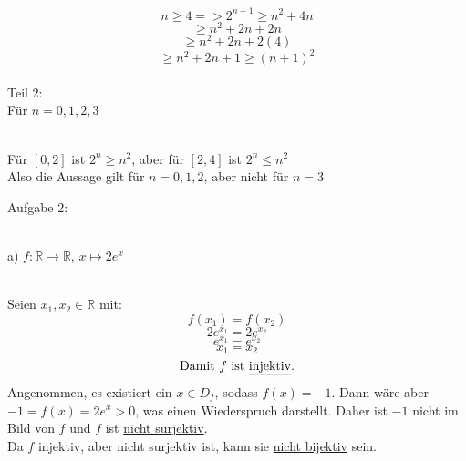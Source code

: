 \documentclass[11pt]{article}
\begin{document}
					$$n\geq4 => 2^{n+1} \geq n^2+4n$$
					$$\geq n^2 + 2n + 2n$$
					$$\geq n^2 + 2n + 2(4)$$
					$$\geq n^2 + 2n + 1 \geq (n+1)^2$$\\
				Teil 2:\\
				Für $n=0,1,2,3$	\\
				\\
			Für $[0,2]$ ist $2^n \geq n^2$, aber für $[2,4]$ ist $2^n \leq n^2$\\
			Also die Aussage gilt für $n=0,1,2$, aber nicht für $n=3$\\
		\noindent \begin{Large}Aufgabe 2:\end{Large}\\[2pt]
			\indent a) $f: \mathbb{R} \rightarrow \mathbb{R}$, $x \mapsto 2e^x$\\
			\\
			Seien $x_1, x_2 \in \mathbb{R}$ mit:
				$$f(x_1)=f(x_2)$$
				$$2e^{x_1}=2e^{x_2}$$
				$$e^{x_1}=e^{x_2}$$
				$$x_1=x_2$$
				$$\mbox{Damit }f \mbox{ ist \underline{injektiv}.}$$
				Angenommen, es existiert ein $x \in D_f$, sodass $f(x)=-1$. Dann wäre aber $-1=f(x)=2e^x>0$, was einen Wiederspruch darstellt. Daher ist $-1$ nicht im Bild von $f$ und $f$ ist \underline{nicht surjektiv}.\\
				Da $f$ injektiv, aber nicht surjektiv ist, kann sie \underline{nicht bijektiv} sein.\\
\end{document}
